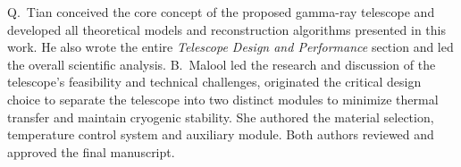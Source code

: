 \documentclass{aastex701}
\begin{document}
\begin{contribution}
Q.~Tian conceived the core concept of the proposed gamma-ray telescope and developed all theoretical models and reconstruction algorithms presented in this work. He also wrote the entire \textit{Telescope Design and Performance} section and led the overall scientific analysis. B.~Malool led the research and discussion of the telescope's feasibility and technical challenges, originated the critical design choice to separate the telescope into two distinct modules to minimize thermal transfer and maintain cryogenic stability. She authored the material selection, temperature control system and auxiliary module. Both authors reviewed and approved the final manuscript.
\end{contribution}

{}

\end{document}
